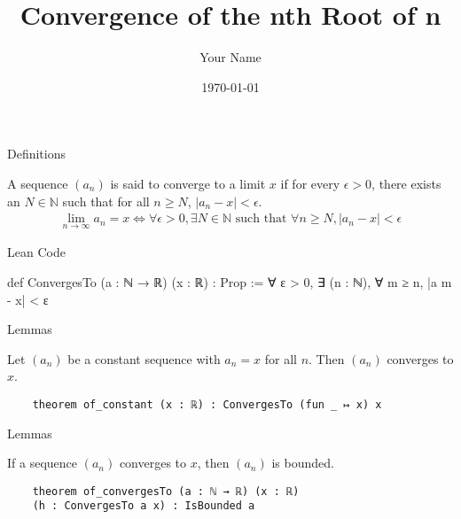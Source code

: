 \documentclass{beamer}
\title{Convergence of the nth Root of n}
\author{Your Name}
\date{\today}
\begin{document}
\begin{frame}
    \titlepage
\end{frame}

\begin{frame}[fragile]{Definitions}
    \begin{definition}
        A sequence $(a_n)$ is said to converge to a limit $x$ if for every $\epsilon > 0$, there exists an $N \in \mathbb{N}$ such that for all $n \geq N$, $|a_n - x| < \epsilon$.
        \begin {align*}
            \lim_{n \to \infty} a_n = x \iff \forall \epsilon > 0, \exists N \in \mathbb{N} \text{ such that } \forall n \geq N, |a_n - x| < \epsilon
        \end {align*}
    \end{definition}
    
    \begin{block}{Lean Code}
    \begin{leancode}
        def ConvergesTo (a : ℕ → ℝ) (x : ℝ) : Prop := 
            ∀ ε > 0, ∃ (n : ℕ), ∀ m ≥ n, |a m - x| < ε
    \end{leancode}
    \end{block}

\end{frame}

\begin{frame}[fragile]{Lemmas}
    \begin{lemma} 
        Let $(a_n)$ be a constant sequence with $a_n = x$ for all $n$. Then $(a_n)$ converges to $x$.
    \end{lemma}

    \begin{definition}
    \begin{lstlisting}
    theorem of_constant (x : ℝ) : ConvergesTo (fun _ ↦ x) x
    \end{lstlisting}
    \end{definition}
\end{frame}

\begin{frame}[fragile]{Lemmas}
    \begin{lemma}
        If a sequence $(a_n)$ converges to $x$, then $(a_n)$ is bounded.
    \end{lemma}

    \begin{lemma}
    \begin{lstlisting}
    theorem of_convergesTo (a : ℕ → ℝ) (x : ℝ) 
    (h : ConvergesTo a x) : IsBounded a 
    \end{lstlisting}
    \end{lemma}
\end{frame}
\end{document}

